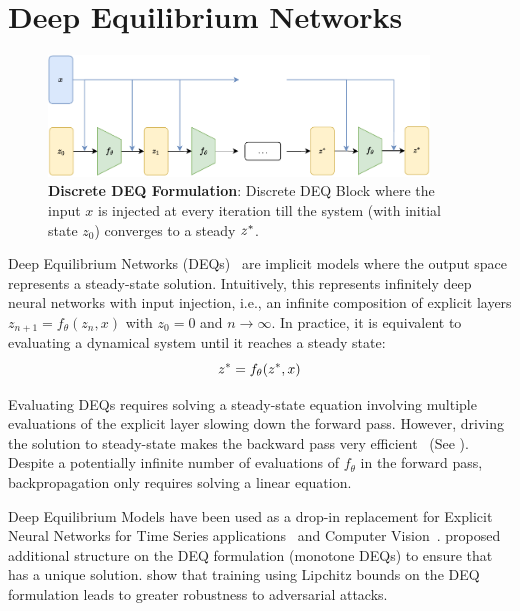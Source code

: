 \section{Deep Equilibrium Networks}
\label{sec:deep_equilibrium_networks}

\begin{figure}[t]
  \centering
  \includegraphics[width=0.9\textwidth]{../figures/deep_equilibrium_models/model_architecture.pdf}
  \caption{\textbf{Discrete DEQ Formulation}: Discrete DEQ Block where the input $x$ is injected at every iteration till the system (with initial state $z_0$) converges to a steady $z^*$.}
  \label{fig:model_architecture_discrete_deq}
\end{figure}

Deep Equilibrium Networks (DEQs)~\citep{bai_deep_2019} are implicit models where the output space represents a steady-state solution. Intuitively, this represents infinitely deep neural networks with input injection, i.e., an infinite composition of explicit layers $z_{n + 1} = f_\theta(z_n, x)$ with $z_0 = 0$ and $n \rightarrow \infty$. In practice, it is equivalent to evaluating a dynamical system until it reaches a steady state:
%
\begin{equation}
  z^* = f_\theta(z^*, x)\label{eq:discrete_deq}
\end{equation}
%

Evaluating DEQs requires solving a steady-state equation involving multiple evaluations of the explicit layer slowing down the forward pass. However, driving the solution to steady-state makes the backward pass very efficient~\citep{johnson2012notes} (See ). Despite a potentially infinite number of evaluations of $f_\theta$ in the forward pass, backpropagation only requires solving a linear equation.

Deep Equilibrium Models have been used as a drop-in replacement for Explicit Neural Networks for Time Series applications~\citep{bai_deep_2019} and Computer Vision~\citep{bai_multiscale_2020}. \citet{winston2020monotone} proposed additional structure on the DEQ formulation (monotone DEQs) to ensure that  has a unique solution. \citet{revay_lipschitz_2020} show that training using Lipchitz bounds on the DEQ formulation leads to greater robustness to adversarial attacks.

